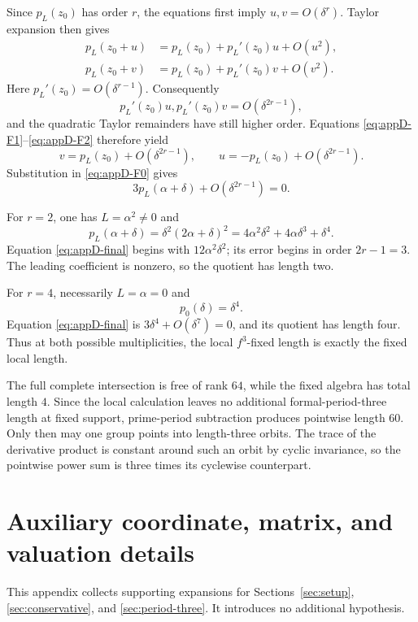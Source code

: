 \documentclass[11pt]{article}
\theoremstyle{definition}
\begin{document}
Since $p_L(z_0)$ has order $r$, the equations first imply $u,v=O(\delta^r)$. Taylor expansion then gives
\begin{align*}
p_L(z_0+u)
&=p_L(z_0)+p_L'(z_0)u+O(u^2),\\
p_L(z_0+v)
&=p_L(z_0)+p_L'(z_0)v+O(v^2).
\end{align*}
Here $p_L'(z_0)=O(\delta^{r-1})$. Consequently
\[
p_L'(z_0)u, p_L'(z_0)v
=O(\delta^{2r-1}),
\]
and the quadratic Taylor remainders have still higher order. Equations \eqref{eq:appD-F1}--\eqref{eq:appD-F2} therefore yield
\begin{equation}
v=p_L(z_0)+O(\delta^{2r-1}),
\qquad
u=-p_L(z_0)+O(\delta^{2r-1}).
\label{eq:appD-uv}
\end{equation}
Substitution in \eqref{eq:appD-F0} gives
\begin{equation}
3p_L(\alpha+\delta)+O(\delta^{2r-1})=0.
\label{eq:appD-final}
\end{equation}

For $r=2$, one has $L=\alpha^2\ne0$ and
\[
p_L(\alpha+\delta)
=\delta^2(2\alpha+\delta)^2
=4\alpha^2\delta^2+4\alpha\delta^3+\delta^4.
\]
Equation \eqref{eq:appD-final} begins with $12\alpha^2\delta^2$; its error begins in order $2r-1=3$. The leading coefficient is nonzero, so the quotient has length two.

For $r=4$, necessarily $L=\alpha=0$ and
\[
p_0(\delta)=\delta^4.
\]
Equation \eqref{eq:appD-final} is $3\delta^4+O(\delta^7)=0$, and its quotient has length four. Thus at both possible multiplicities, the local $f^3$-fixed length is exactly the fixed local length.

The full complete intersection is free of rank $64$, while the fixed algebra has total length $4$. Since the local calculation leaves no additional formal-period-three length at fixed support, prime-period subtraction produces pointwise length $60$. Only then may one group points into length-three orbits. The trace of the derivative product is constant around such an orbit by cyclic invariance, so the pointwise power sum is three times its cyclewise counterpart.

\section{Auxiliary coordinate, matrix, and valuation details}
\label{app:auxiliary}

This appendix collects supporting expansions for Sections~\ref{sec:setup}, \ref{sec:conservative}, and \ref{sec:period-three}. It introduces no additional hypothesis.
\end{document}
